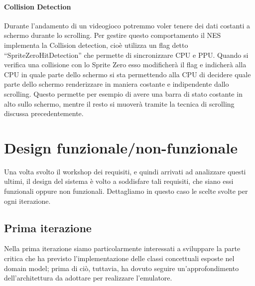 \documentclass[11pt]{article}
\begin{document}
\paragraph{Collision Detection}
Durante l’andamento di un videogioco potremmo voler tenere dei dati costanti a schermo durante lo scrolling. Per gestire questo comportamento il NES implementa la Collision detection, cioè utilizza un flag detto “SpriteZeroHitDetection” che permette di sincronizzare CPU e PPU.  Quando si verifica una collisione con lo Sprite Zero esso modificherà il flag e indicherà alla CPU in quale parte dello schermo si sta permettendo alla CPU di decidere quale parte dello schermo renderizzare in maniera costante e indipendente dallo scrolling. Questo permette per esempio di avere una barra di stato costante in alto sullo schermo, mentre il resto si muoverà tramite la tecnica di scrolling discussa precedentemente.
\clearpage

\section{Design funzionale/non-funzionale}
Una volta svolto il workshop dei requisiti, e quindi arrivati ad analizzare questi ultimi, il design del sistema è volto a soddisfare tali requisiti, che siano essi funzionali oppure non funzionali. Dettagliamo in questo caso le scelte svolte per ogni iterazione.
\subsection{Prima iterazione}
Nella prima iterazione siamo particolarmente interessati a sviluppare la parte critica che ha previsto l'implementazione delle classi concettuali esposte nel domain model; prima di ciò, tuttavia, ha dovuto seguire un'approfondimento dell'architettura da adottare per realizzare l'emulatore.
\end{document}
